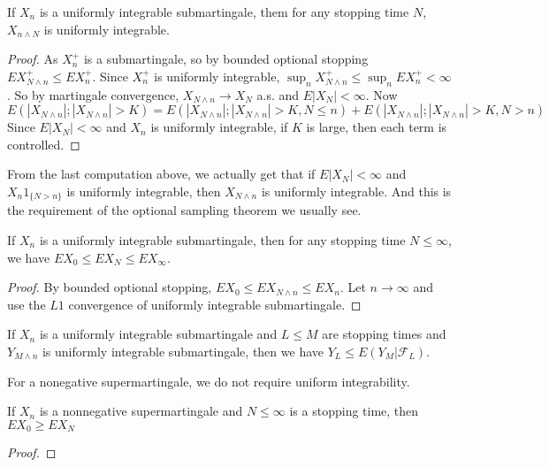 \begin{theorem}
    If $X_n$ is a uniformly integrable submartingale, them for any stopping time $N$,
    $X_{n\wedge N}$ is uniformly integrable.
\end{theorem}
\begin{proof}
    As $X_n^+$ is a submartingale, so by bounded optional stopping $EX_{N\wedge n}^+ \le EX_n^+$.
    Since $X_n^+$ is uniformly integrable, $\sup_n X_{N\wedge n}^+ \le \sup_n EX_n^+ <\infty$. So by martingale convergence, $X_{N\wedge n}\to X_N$ a.s. and $E|X_N|<\infty$.
    Now
    \begin{equation*}
        E(|X_{N\wedge n}|;|X_{N\wedge n}|>K) = E(|X_{N\wedge n}|;|X_{N\wedge n}|>K,N\le n)+E(|X_{N\wedge n}|;|X_{N\wedge n}|>K,N>n)
    \end{equation*}
    Since $E|X_N|<\infty$ and $X_n$ is uniformly integrable, if $K$ is large, then each term is controlled.

\end{proof}
\begin{remark}
    From the last computation above, we actually get that if $E|X_N|<\infty$ and $X_n1_{\{N>n\}}$ is uniformly integrable,
    then $X_{N\wedge n}$ is uniformly integrable. And this is the requirement of the optional sampling theorem we usually see.
\end{remark}

\begin{theorem}
    If $X_n$ is a uniformly integrable submartingale, then for any stopping time $N\le \infty$,
    we have $EX_0\le EX_N\le EX_\infty$. 
\end{theorem}
\begin{proof}
    By bounded optional stopping, $EX_0\le EX_{N\wedge n}\le EX_n$. Let $n\to\infty$ and use the $L1$ convergence of uniformly integrable submartingale.
\end{proof}

\begin{theorem}
    If $X_n$ is a uniformly integrable submartingale and $L\le M$ are stopping times and $Y_{M\wedge n}$ is uniformly integrable submartingale,
    then we have $Y_L\le E(Y_M|\mathcal{F}_L)$. 
\end{theorem}

For a nonegative supermartingale, we do not require uniform integrability.
\begin{theorem}
    If $X_n$ is a nonnegative supermartingale and $N\le\infty$ is a stopping time,
    then $EX_0\geq EX_N$
\end{theorem}
\begin{proof}
    
\end{proof}

